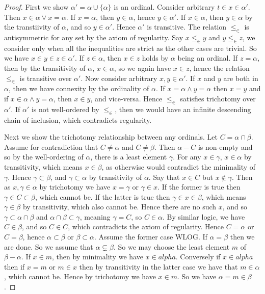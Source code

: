 \documentclass[]{article}
\begin{document}
\begin{proof}
		First we show $\alpha' = \alpha \cup \{\alpha\}$ is an ordinal. Consider arbitrary $t \in x \in \alpha'$. Then $x \in \alpha \lor x = \alpha$. If $x = \alpha$, then $y \in \alpha$, hence $y \in \alpha'$. If  $x \in \alpha$, then $y \in \alpha$ by the transtiivity of $\alpha$, and so $y \in \alpha'$. Hence $\alpha'$ is transitive. The relation $\leq_\in$ is antisymmetric for any set by the axiom of regularity. Say $x \leq_\in y$ and $y \leq_\in z$, we consider only when all the inequalities are strict as the other cases are trivial. So we have $x \in y \in z \in \alpha'$. If $z \in \alpha$, then $x \in z$ holds by $\alpha$ being an ordinal. If $z = \alpha$, then by the transitivity of $\alpha$, $x \in \alpha$, so we again have $x \in z$,  hence the relation $\leq_\in$ is transitive over $\alpha'$. Now consider arbitrary  $x, y \in \alpha'$. If $x$ and $y$ are both in $\alpha$, then we have connexity by the ordinality of $\alpha$. If $x = \alpha \land y = \alpha$ then $x = y$ and if $x \in \alpha \land y = \alpha$, then $x \in y$, and vice-versa. Hence  $\leq_\in$ satisfies trichotomy over $\alpha'$. If $\alpha'$ is not well-ordered by $\leq_\in$, then we would have an infinite descending chain of inclusion, which contradicts regularity.

	Next we show the trichotomy relationship between any ordinals. Let $C = \alpha \cap \beta$. Assume for contradiction that $C \neq \alpha$ and $C \neq \beta$. Then $\alpha - C$ is non-empty and so by the well-ordering of $\alpha$, there is a least element $\gamma$. For any $x \in \gamma$, $x \in \alpha$ by transitivity, which means $x \in \beta$, as otherwise would contradict the minimality of $\gamma$. Hence $\gamma \subset \beta$, and $\gamma \subset \alpha$ by transitivity of $\alpha$. Say that $x \in C$ but $x \not\in \gamma$. Then as $x, \gamma \in \alpha$ by trichotomy we have $x = \gamma$ or $\gamma \in x$. If the former is true then $\gamma \in C \subset \beta$, which cannot be. If the latter is true then $\gamma \in x \in \beta$, which means $\gamma \in \beta$ by transitivity, which also cannot be. Hence there are no such $x$, and so $\gamma \subset \alpha \cap \beta$ and $\alpha \cap \beta \subset \gamma$, meaning $\gamma = C$, so $C \in \alpha$. By similar logic, we have $C \in \beta$, and so $C \in C$, which contradicts the axiom of regularity. Hence $C = \alpha$ or $C = \beta$, hence $\alpha \subset \beta$ or $\beta \subset \alpha$. Assume the former case WLOG. If $\alpha = \beta$ then we are done. So we assume that $\alpha \subsetneq \beta$. So we may choose the least element $m$ of $\beta - \alpha$. If $x \in m$, then by minimality we have $x \in alpha$. Conversely if $x \in alpha$ then if $x = m$ or $m \in x$ then by transitivity in the latter case we have that $m \in \alpha$, which cannot be. Hence by trichotomy we have $x \in m$. So we have $\alpha = m \in \beta$.


\end{proof}
\end{document}
